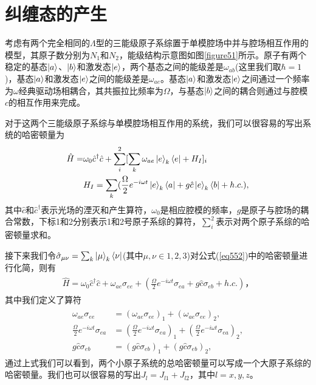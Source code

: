 \vbox{}
\section{纠缠态的产生}
\vbox{}
考虑有两个完全相同的$\Lambda$型的三能级原子系综置于单模腔场中并与腔场相互作用的模型，其原子数分别为$N_1$和$N_2$，能级结构示意图如图\ref{figure51}所示。原子有两个稳定的基态$\ket{a}$、$\ket{b}$和激发态$\ket{e}$，两个基态之间的能级差是$\omega_{ab}$(这里我们取$\hbar=1$)，基态$\ket{a}$和激发态$\ket{e}$之间的能级差是$\omega_{ae}$。基态$\ket{a}$和激发态$\ket{e}$之间通过一个频率为$\omega$经典驱动场相耦合，其共振拉比频率为$\Omega$，与基态$\ket{b}$之间的耦合则通过与腔模$c$的相互作用来完成。

对于这两个三能级原子系综与单模腔场相互作用的系统，我们可以很容易的写出系统的哈密顿量为
\begin{align}\label{eq552}
	\begin{split}
		\hat H   =& \omega_0\hat c^\dag \hat c+\sum_{i}^{2}[\sum_k \omega_{ae}\ket{e}_k\bra{e}
		+ H_I]_i \\
		&H_I= \sum_k (\frac{\Omega}{2}e^{-i\omega t}\ket{e}_k\bra{a}
		+g\hat c\ket{e}_k\bra{b}+h.c.),
	\end{split}
\end{align}
其中$\hat c$和$\hat c^\dagger$表示光场的湮灭和产生算符，$\omega_0$是相应腔模的频率，$g$是原子与腔场的耦合常数，下标1和2分别表示1和2号原子系综的算符，$\sum_i^2$表示对两个原子系综的哈密顿量求和。

接下来我们令$\hat \sigma_{\mu\nu}=\sum_k{\ket{\mu}_k\bra{\nu}}$(其中$\mu,\nu\in {1,2,3}$)对公式(\ref{eq552})中的哈密顿量进行化简，则有
\begin{align}\label{eq553}
	\begin{split}
		\hat H   = \omega_0\hat c^\dag \hat c + \omega_{ae}\sigma_{ee}
		+(\frac{\Omega}{2}e^{-i\omega t}\sigma_{ea}+g\hat c\sigma_{eb}+h.c.)，
	\end{split}
\end{align}
其中我们定义了算符
\begin{align}	\label{eq554}
	\begin{split}
		\omega_{ae}\sigma_{ee}                   &= (\omega_{ae}\sigma_{ee})_1
		+(\omega_{ae}\sigma_{ee})_2,\\
		\frac{\Omega}{2}e^{-i\omega t}\sigma_{ea}&= (\frac{\Omega}{2}e^{-i\omega t}\sigma_{ea})_1
		+(\frac{\Omega}{2}e^{-i\omega t}\sigma_{ea})_2,\\
		g\hat c\sigma_{eb}                       &= (g\hat c\sigma_{eb})_1
		+(g\hat c\sigma_{eb})_2,
	\end{split}
\end{align}
通过上式我们可以看到，两个小原子系统的总哈密顿量可以写成一个大原子系综的哈密顿量。我们也可以很容易的写出$J_l=J_{l1}+J_{l2}$，其中$l=x,y,z$。

